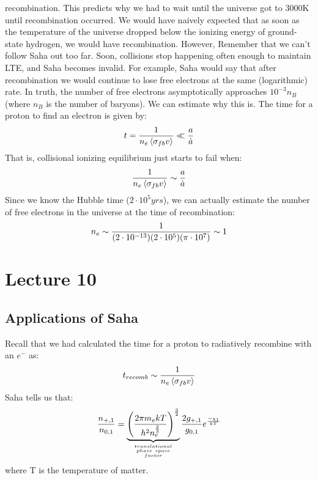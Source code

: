 \documentclass[11pt]{article}
\def\.{\dot}
\def\inv#1{{1 \over #1}}
\def\mean#1{\left\langle #1\right\rangle}
\def\e#1{\cdot10^{#1}}
\begin{document}
recombination.  This predicts why we had to wait until the
universe got to 3000K until recombination occurred.  We would have naively 
expected
that as soon as the temperature of the universe dropped below the ionizing 
energy of ground-state hydrogen, we would have recombination.  However, 
Remember that we can't follow Saha out too far.  Soon, collisions stop happening
often enough to maintain LTE, and Saha becomes invalid.  For example, Saha
would say that after recombination we would continue to lose free electrons
at the same (logarithmic) rate.  In truth, the number of free electrons
asymptotically approaches $10^{-3}n_B$ (where $n_B$ is the number of baryons).
We can estimate why this is.  The time for a proton to find an electron is
given by:
$$t=\inv{n_e\mean{\sigfb v}}\ll{a\over \.a}$$
That is, collisional ionizing equilibrium just starts to fail when:
$$\inv{n_e\mean{\sigfb v}}\sim{a\over \.a}$$
Since we know the Hubble time ($2\e5 yrs$), we can actually estimate
the number of free electrons in the universe at the time of recombination:
$$n_e\sim\inv{(2\e{-13})(2\e5)(\pi\e7)}\sim1$$

\section*{ Lecture 10 }

\subsection*{ Applications of Saha}

Recall that we had calculated the time for a proton to radiatively recombine
with an $e^-$ as:
$$t_{recomb}\sim\inv{n_e\mean{\sigfb v}}$$
Saha tells us that:
$${\npo\over\noo}=\underbrace{\left({2\pi m_ekT\over 
h^2n_e^{2\over3}}\right)^{3\over2}}_{{translational\atop phase\ space}\atop factor}
{2\gpo\over\goo}e^{-\chi_1\over kT}$$
where T is the temperature of matter.
\end{document}
